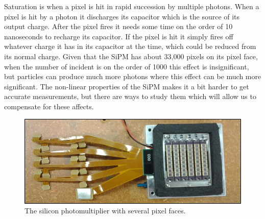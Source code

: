 Saturation is when a pixel is hit in rapid succession by multiple photons. When a pixel is hit by a photon it discharges its capacitor which is the source of its output charge. After the pixel fires it needs some time on the order of 10 nanoseconds to recharge its capacitor. If the pixel is hit it simply fires off whatever charge it has in its capacitor at the time, which could be reduced from its normal charge. Given that the SiPM has about 33,000 pixels on its pixel face, when the number of incident is on the order of 1000 this effect is insignificant, but particles can produce much more photons where this effect can be much more significant. The non-linear properties of the SiPM makes it a bit harder to get accurate measurements, but there are ways to study them which will allow us to compensate for these affects.

\begin{figure}
\centering
\includegraphics[width=\linewidth]{Figures/SiPM.jpg}
\caption{The silicon photomultiplier with several pixel faces.}
\label{fig:SiPM}
\end{figure}




